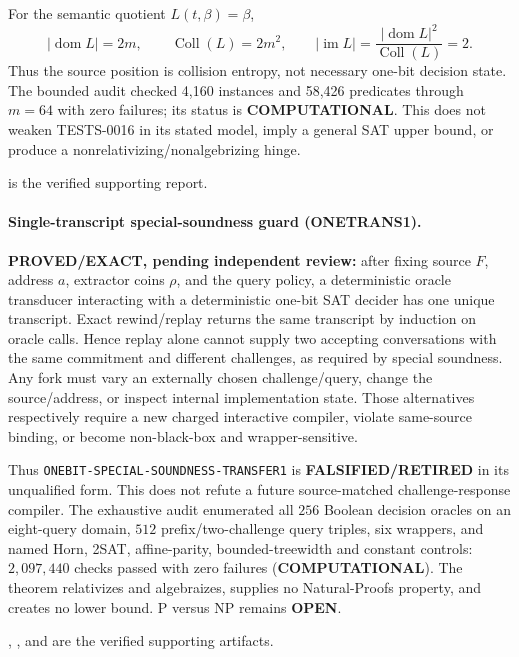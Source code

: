\documentclass[11pt]{article}
\begin{document}
For the semantic quotient $L(t,\beta)=\beta$,
\[
 |\operatorname{dom}L|=2m,\qquad
 \operatorname{Coll}(L)=2m^2,\qquad
 |\operatorname{im}L|=\frac{|\operatorname{dom}L|^2}{\operatorname{Coll}(L)}=2.
\]
Thus the source position is collision entropy, not necessary one-bit decision state.  The bounded audit checked 4,160 instances and 58,426 predicates through $m=64$ with zero failures; its status is \textbf{COMPUTATIONAL}.  This does not weaken TESTS-0016 in its stated model, imply a general SAT upper bound, or produce a nonrelativizing/nonalgebrizing hinge.

 is the verified supporting report.

\paragraph{Single-transcript special-soundness guard (ONETRANS1).}
\textbf{PROVED/EXACT, pending independent review:} after fixing source \(F\),
address \(a\), extractor coins \(\rho\), and the query policy, a deterministic
oracle transducer interacting with a deterministic one-bit SAT decider has one
unique transcript.  Exact rewind/replay returns the same transcript by induction
on oracle calls.  Hence replay alone cannot supply two accepting conversations
with the same commitment and different challenges, as required by special
soundness.  Any fork must vary an externally chosen challenge/query, change the
source/address, or inspect internal implementation state.  Those alternatives
respectively require a new charged interactive compiler, violate same-source
binding, or become non-black-box and wrapper-sensitive.

Thus \texttt{ONEBIT-SPECIAL-SOUNDNESS-TRANSFER1} is
\textbf{FALSIFIED/RETIRED} in its unqualified form.  This does not refute a
future source-matched challenge-response compiler.  The exhaustive audit
enumerated all \(256\) Boolean decision oracles on an eight-query domain,
\(512\) prefix/two-challenge query triples, six wrappers, and named Horn,
2SAT, affine-parity, bounded-treewidth and constant controls:
\(2{,}097{,}440\) checks passed with zero failures
(\textbf{COMPUTATIONAL}).  The theorem relativizes and algebraizes, supplies no
Natural-Proofs property, and creates no lower bound.  P versus NP remains
\textbf{OPEN}.

,
, and
are the verified supporting artifacts.
\end{document}
